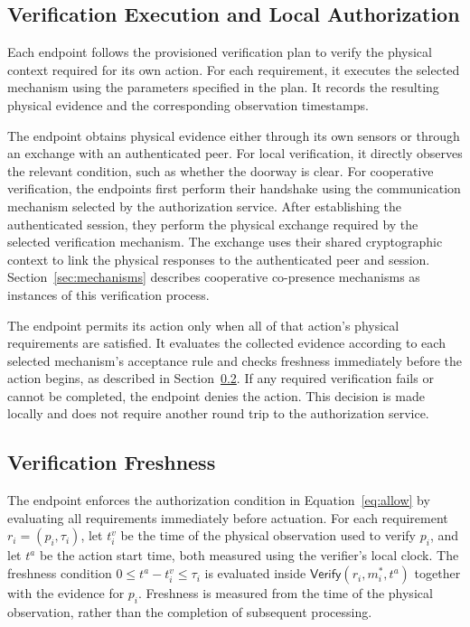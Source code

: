 \documentclass[sigconf,authordraft]{acmart}
\begin{document}
\subsection{Verification Execution and Local Authorization}
\label{sec:execution}

Each endpoint follows the provisioned verification plan to verify the physical context required for its own action.
For each requirement, it executes the selected mechanism using the parameters specified in the plan.
It records the resulting physical evidence and the corresponding observation timestamps.

The endpoint obtains physical evidence either through its own sensors or through an exchange with an authenticated peer.
For local verification, it directly observes the relevant condition, such as whether the doorway is clear.
For cooperative verification, the endpoints first perform their handshake using the communication mechanism selected by the authorization service.
After establishing the authenticated session, they perform the physical exchange required by the selected verification mechanism.
The exchange uses their shared cryptographic context to link the physical responses to the authenticated peer and session.
Section~\ref{sec:mechanisms} describes cooperative co-presence mechanisms as instances of this verification process.

The endpoint permits its action only when all of that action's physical requirements are satisfied.
It evaluates the collected evidence according to each selected mechanism's acceptance rule and checks freshness immediately before the action begins, as described in Section~\ref{sec:freshness}.
If any required verification fails or cannot be completed, the endpoint denies the action.
This decision is made locally and does not require another round trip to the authorization service.

\subsection{Verification Freshness}
\label{sec:freshness}

The endpoint enforces the authorization condition in Equation~\eqref{eq:allow} by evaluating all requirements immediately before actuation.
For each requirement $r_i=(p_i,\tau_i)$, let $t_i^v$ be the time of the physical observation used to verify $p_i$, and let $t^a$ be the action start time, both measured using the verifier's local clock.
The freshness condition $0\leq t^a-t_i^v\leq\tau_i$ is evaluated inside $\mathsf{Verify}(r_i,m_i^*,t^a)$ together with the evidence for $p_i$.
Freshness is measured from the time of the physical observation, rather than the completion of subsequent processing.
\end{document}
